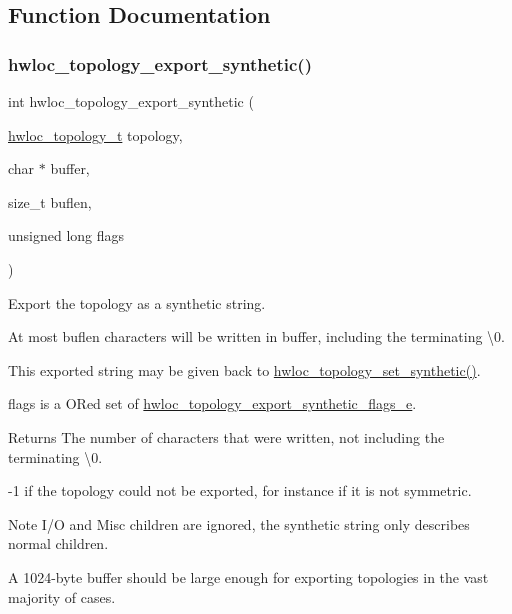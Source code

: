 \subsection{Function Documentation}
\mbox{\label{a00207_ga24b7864a1c588309c4749f621f03b4c7}} 
\subsubsection{\texorpdfstring{hwloc\+\_\+topology\+\_\+export\+\_\+synthetic()}{hwloc\_topology\_export\_synthetic()}}
{\footnotesize\ttfamily int hwloc\+\_\+topology\+\_\+export\+\_\+synthetic (\begin{DoxyParamCaption}\item[{\hyperlink{a00186_ga9d1e76ee15a7dee158b786c30b6a6e38}{hwloc\+\_\+topology\+\_\+t}}]{topology,  }\item[{char $\ast$}]{buffer,  }\item[{size\+\_\+t}]{buflen,  }\item[{unsigned long}]{flags }\end{DoxyParamCaption})}



Export the topology as a synthetic string. 

At most {\ttfamily buflen} characters will be written in {\ttfamily buffer}, including the terminating \textbackslash{}0.

This exported string may be given back to \hyperlink{a00192_ga4fab186bb6181a00bcf585825fddd38d}{hwloc\+\_\+topology\+\_\+set\+\_\+synthetic()}.

{\ttfamily flags} is a OR\textquotesingle{}ed set of \hyperlink{a00207_ga7ac6f97cc40bd50c40285084f869ba63}{hwloc\+\_\+topology\+\_\+export\+\_\+synthetic\+\_\+flags\+\_\+e}.

\begin{DoxyReturn}{Returns}
The number of characters that were written, not including the terminating \textbackslash{}0.

-\/1 if the topology could not be exported, for instance if it is not symmetric.
\end{DoxyReturn}
\begin{DoxyNote}{Note}
I/O and Misc children are ignored, the synthetic string only describes normal children.

A 1024-\/byte buffer should be large enough for exporting topologies in the vast majority of cases. 
\end{DoxyNote}
